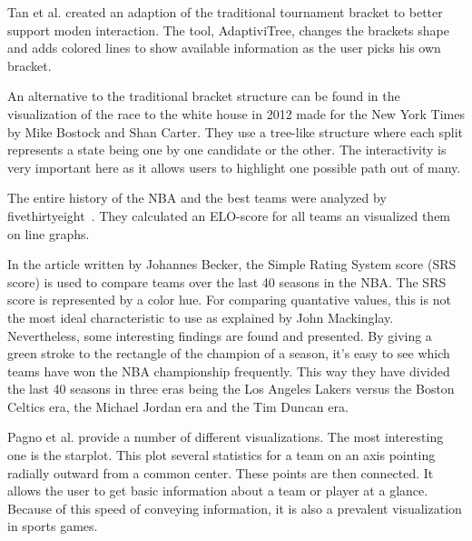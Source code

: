 \documentclass[chi_draft]{sigchi}
\begin{document}
Tan et al. created an adaption of the traditional tournament bracket to better
support moden interaction\cite{adaptivitree}. The tool, AdaptiviTree, changes
the brackets shape and adds colored lines to show available information as the
user picks his own bracket.

An alternative to the traditional bracket structure can be found in the
visualization of the race to the white house in 2012 made for the New York Times
by Mike Bostock and Shan Carter\cite{whitehousepath}. They use a tree-like
structure where each split represents a state being one by one candidate or the
other. The interactivity is very important here as it allows users to highlight
one possible path out of many.

The entire history of the NBA and the best teams were analyzed by
fivethirtyeight~\cite{fivethirtyeight}. They calculated an ELO-score\cite{eloraring} 
for all teams an visualized them on line graphs. 

In the article written by Johannes Becker\cite{nbaempires}, the Simple Rating System 
score (SRS score) is used to compare teams over the last 40 seasons in the NBA. The 
SRS score is represented by a color hue. For comparing quantative values, this is 
not the most ideal characteristic to use as explained by John Mackinglay\cite{automatingdesign}. Nevertheless, some interesting findings are found and presented. By giving a green stroke to the rectangle of the champion of a season, 
it's easy to see which teams have won the NBA championship frequently. This way 
they have divided the last 40 seasons in three eras being the Los Angeles Lakers 
versus the Boston Celtics era, the Michael Jordan era and the Tim Duncan era. 

Pagno et al. provide a number of different visualizations\cite{starplots}. The
most interesting one is the starplot. This plot several statistics for a team on
an axis pointing radially outward from a common center. These points are then
connected. It allows the user to get basic information about a team or player at
a glance. Because of this speed of conveying information, it is also a prevalent
visualization in sports games.



\end{document}
